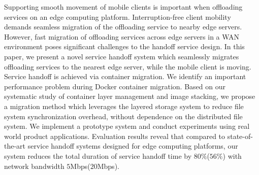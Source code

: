 
Supporting smooth movement of mobile clients is important when offloading services on an edge computing platform. Interruption-free client mobility demands seamless migration of the offloading service to nearby edge servers.
However, fast migration of offloading services across edge servers in a WAN environment poses significant challenges to the handoff service design. 
In this paper, we present a novel service handoff system which seamlessly migrates offloading services to the nearest edge server, while the mobile client is moving. 
Service handoff is achieved via container migration. 
We identify an important performance problem during Docker container migration.
Based on our systematic study of container layer management and image stacking,
we propose a migration method which leverages the layered storage system to reduce file system synchronization overhead, without dependence on the distributed file system. 
We implement a prototype system and conduct experiments using real world product applications.
Evaluation results reveal that compared to state-of-the-art service handoff systems designed for edge computing platforms, our system reduces the total duration of service handoff time by 
$80\%$($56\%$) with network bandwidth $5$Mbps($20$Mbps).







%
%
%

